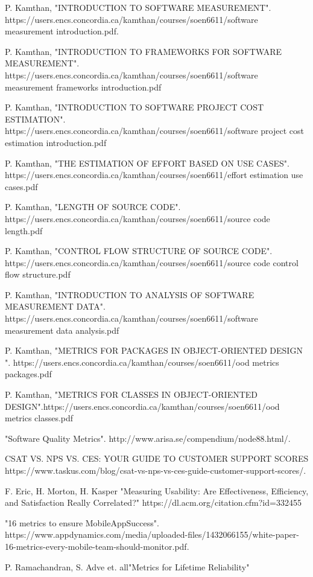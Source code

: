 \documentclass[a4paper, 11pt]{article}
\begin{document}
\begin{thebibliography}{12}

  {P. Kamthan, "INTRODUCTION TO SOFTWARE MEASUREMENT". https://users.encs.concordia.ca/kamthan/courses/soen6611/software measurement introduction.pdf}.

  {P. Kamthan, "INTRODUCTION TO FRAMEWORKS FOR
SOFTWARE MEASUREMENT". https://users.encs.concordia.ca/kamthan/courses/soen6611/software measurement frameworks introduction.pdf}

  {P. Kamthan, "INTRODUCTION TO
SOFTWARE PROJECT COST ESTIMATION". https://users.encs.concordia.ca/kamthan/courses/soen6611/software project cost estimation introduction.pdf}

  {P. Kamthan, "THE ESTIMATION OF EFFORT BASED ON USE CASES". https://users.encs.concordia.ca/kamthan/courses/soen6611/effort estimation use cases.pdf}

  {P. Kamthan, "LENGTH OF SOURCE CODE". https://users.encs.concordia.ca/kamthan/courses/soen6611/source code length.pdf}

  {P. Kamthan, "CONTROL FLOW STRUCTURE OF SOURCE CODE". https://users.encs.concordia.ca/kamthan/courses/soen6611/source code control flow structure.pdf}

  {P. Kamthan, "INTRODUCTION TO ANALYSIS OF
SOFTWARE MEASUREMENT DATA". https://users.encs.concordia.ca/kamthan/courses/soen6611/software measurement data analysis.pdf}

  {P. Kamthan, "METRICS FOR PACKAGES IN OBJECT-ORIENTED DESIGN ". https://users.encs.concordia.ca/kamthan/courses/soen6611/ood metrics packages.pdf}

  {P. Kamthan, "METRICS FOR CLASSES IN OBJECT-ORIENTED DESIGN".https://users.encs.concordia.ca/kamthan/courses/soen6611/ood metrics classes.pdf}

  {"Software Quality Metrics". http://www.arisa.se/compendium/node88.html/}. 

 {CSAT VS. NPS VS. CES: YOUR GUIDE TO CUSTOMER SUPPORT SCORES} {https://www.taskus.com/blog/csat-vs-nps-vs-ces-guide-customer-support-scores/}.

 {F. Eric, H. Morton, H. Kasper "Measuring Usability: Are Effectiveness, Efficiency, and Satisfaction Really Correlated?"} {https://dl.acm.org/citation.cfm?id=332455}

 {"16 metrics to ensure MobileAppSuccess". https://www.appdynamics.com/media/uploaded-files/1432066155/white-paper-16-metrics-every-mobile-team-should-monitor.pdf}.

 {P. Ramachandran, S. Adve et. all"Metrics for Lifetime Reliability"}

\end{thebibliography} 
\end{document}
